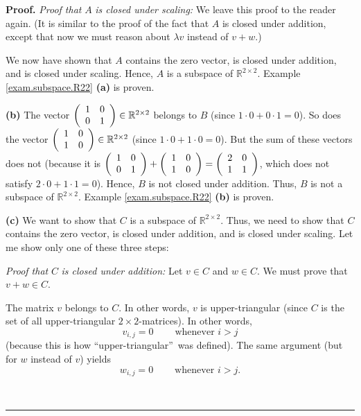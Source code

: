 \documentclass[numbers=enddot,12pt,final,onecolumn,notitlepage]{scrartcl}%
\theoremstyle{definition}
\newenvironment{proof}[1][Proof]{\noindent\textbf{#1.} }{\ \rule{0.5em}{0.5em}}
\begin{document}
\begin{proof}
\textit{Proof that }$A$ \textit{is closed under scaling:} We leave this proof
to the reader again. (It is similar to the proof of the fact that $A$ is
closed under addition, except that now we must reason about $\lambda v$
instead of $v+w$.)

We now have shown that $A$ contains the zero vector, is closed under addition,
and is closed under scaling. Hence, $A$ is a subspace of $\mathbb{R}%
^{2\times2}$. Example \ref{exam.subspace.R22} \textbf{(a)} is proven.

\textbf{(b)} The vector $\left(
\begin{array}
[c]{cc}%
1 & 0\\
0 & 1
\end{array}
\right)  \in\mathbb{R}^{2\times2}$ belongs to $B$ (since $1\cdot0+0\cdot1=0$).
So does the vector $\left(
\begin{array}
[c]{cc}%
1 & 0\\
1 & 0
\end{array}
\right)  \in\mathbb{R}^{2\times2}$ (since $1\cdot0+1\cdot0=0$). But the sum of
these vectors does not (because it is $\left(
\begin{array}
[c]{cc}%
1 & 0\\
0 & 1
\end{array}
\right)  +\left(
\begin{array}
[c]{cc}%
1 & 0\\
1 & 0
\end{array}
\right)  =\left(
\begin{array}
[c]{cc}%
2 & 0\\
1 & 1
\end{array}
\right)  $, which does not satisfy $2\cdot0+1\cdot1=0$). Hence, $B$ is not
closed under addition. Thus, $B$ is not a subspace of $\mathbb{R}^{2\times2}$.
Example \ref{exam.subspace.R22} \textbf{(b)} is proven.

\textbf{(c)} We want to show that $C$ is a subspace of $\mathbb{R}^{2\times2}%
$. Thus, we need to show that $C$ contains the zero vector, is closed under
addition, and is closed under scaling. Let me show only one of these three steps:

\textit{Proof that }$C$ \textit{is closed under addition:} Let $v\in C$ and
$w\in C$. We must prove that $v+w\in C$.

The matrix $v$ belongs to $C$. In other words, $v$ is upper-triangular (since
$C$ is the set of all upper-triangular $2\times2$-matrices). In other words,%
\begin{equation}
v_{i,j}=0\ \ \ \ \ \ \ \ \ \ \text{whenever }i>j
\label{pf.exam.subspace.R22.c.v}%
\end{equation}
(because this is how \textquotedblleft upper-triangular\textquotedblright\ was
defined). The same argument (but for $w$ instead of $v$) yields%
\begin{equation}
w_{i,j}=0\ \ \ \ \ \ \ \ \ \ \text{whenever }i>j.
\label{pf.exam.subspace.R22.c.w}%
\end{equation}



\end{proof}
\end{document}
